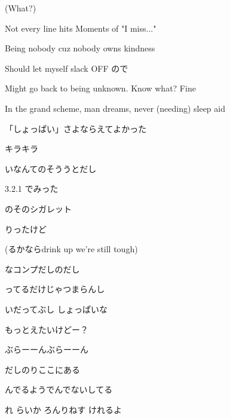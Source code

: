 \documentclass[a4paper,tate,twocolumn,12pt]{ltjtarticle}
\begin{document}
\begin{flushleft}
\begin{minipage}{\linewidth}
(What?)

Not every line hits Moments of "I miss..."

Being nobody cuz nobody owns kindness

Should let myself slack OFF ので

Might go back to being unknown. Know what? Fine

In the grand scheme, man dreams, never (needing) sleep aid

「しょっぱい」さよならえてよかった

キラキラ
\end{minipage}

\vspace{2em}

\noindent\begin{minipage}{\linewidth}
いなんてのそううとだし

3.2.1 でみった

のそのシガレット

りったけど

(るかならdrink up we're still tough)

なコンプだしのだし

ってるだけじゃつまらんし

いだってぶし しょっぱいな

もっとえたいけどー？
\end{minipage}

\vspace{2em}

\noindent\begin{minipage}{\linewidth}
ぶらーーんぶらーーん
\end{minipage}

\vspace{2em}

\noindent\begin{minipage}{\linewidth}
だしのりここにある

んでるようでんでないしてる

れ らいか ろんりねす けれるよ


\end{minipage}
\end{flushleft}
\end{document}
